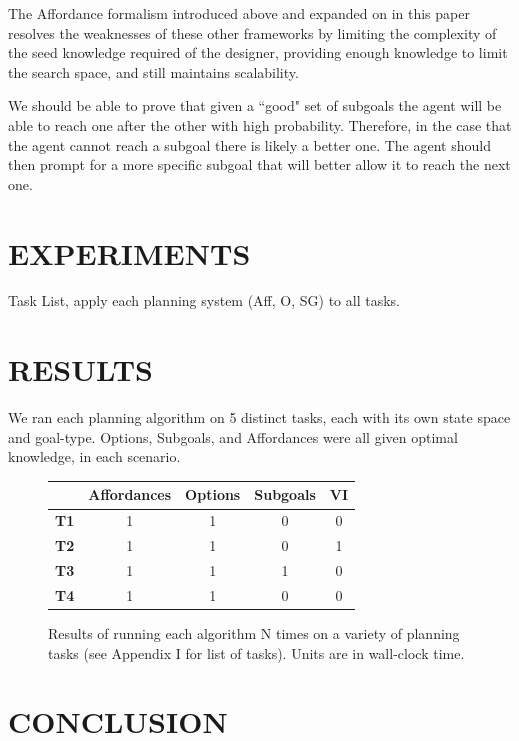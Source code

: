 \documentclass[]{article}
\begin{document}

The Affordance formalism introduced above and expanded on in this paper resolves the weaknesses of these other frameworks by limiting the complexity of the seed knowledge required of the designer, providing enough knowledge to limit the search space, and still maintains scalability.

We should be able to prove that given a ``good" set of subgoals the agent will be able to reach one after the other with high probability. Therefore, in the case that the agent cannot reach a subgoal there is likely a better one. The agent should then prompt for a more specific subgoal that will better allow it to reach the next one.

\section{EXPERIMENTS}

Task List, apply each planning system (Aff, O, SG) to all tasks.





\section{RESULTS}

We ran each planning algorithm on 5 distinct tasks, each with its own state space and goal-type. Options, Subgoals, and Affordances were all given optimal knowledge, in each scenario.


\begin{figure}
\begin{tabular}{ l || c | c | c | c }
  & Affordances & Options & Subgoals & VI \\
  \hline
  {\bf T1} & 1 & 1 & 0 & 0  \\
  {\bf T2} & 1 & 1 & 0 & 1 \\
  {\bf T3} & 1 & 1 & 1 & 0 \\
  {\bf T4} & 1 & 1 & 0 & 0\\
\end{tabular}
\caption{Results of running each algorithm N times on a variety 
of planning tasks (see Appendix I for list of tasks). Units are in 
wall-clock time.}
\end{figure}


\section{CONCLUSION}


  
\end{document}
